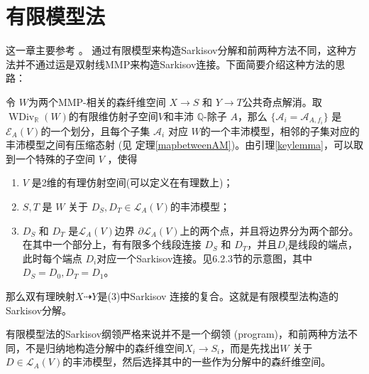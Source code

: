 \chapter{有限模型法}\label{thirdmethod}
这一章主要参考 \cite{haconSarkisovProgram2012}。 通过有限模型来构造Sarkisov分解和前两种方法不同，这种方法并不通过运是双射线MMP来构造Sarkisov连接。下面简要介绍这种方法的思路：

令 $W$为两个MMP-相关的森纤维空间 $X\to S$ 和 $Y\to T$公共奇点解消。取 $\operatorname{WDiv}_{\mathbb{R}}(W)$的有限维仿射子空间$V$和丰沛 $\mathbb{Q}$-除子 $A$，那么 $\{\mathcal{A}_{i} =\mathcal{A}_{A,f_{i}}\} $ 是 $\mathcal{E}_{A}(V)$的一个划分，且每个子集 $\mathcal{A}_{i}$ 对应 $W$的一个丰沛模型，相邻的子集对应的丰沛模型之间有压缩态射 (见 定理\ref{mapbetweenAM})。由引理\ref{keylemma}，可以取到一个特殊的子空间 $V$ ，使得 
\begin{enumerate}
  \item $V$ 是2维的有理仿射空间(可以定义在有理数上)； 
  \item $S,T$ 是 $W$ 关于 $D_{S},D_{T} \in \mathcal{L}_{A}(V) $的丰沛模型；
  \item $D_{S}$ 和 $D_{T}$ 是$\mathcal{L}_{A}(V)$边界 $\partial \mathcal{L}_{A}(V)$上的两个点，并且将边界分为两个部分。在其中一个部分上，有有限多个线段连接 $D_{S}$ 和 $D_{T}$，并且$D_{i}$是线段的端点，此时每个端点 $ D_{i}$对应一个Sarkisov连接。见6.2.3节的示意图，其中$D_S=D_0,D_T=D_1$。
\end{enumerate}
  那么双有理映射$X\dashrightarrow Y$是(3)中Sarkisov 连接的复合。这就是有限模型法构造的Sarkisov分解。
\begin{remark}
  有限模型法的Sarkisov纲领严格来说并不是一个纲领 (program)，和前两种方法不同，不是归纳地构造分解中的森纤维空间$X_{i}\to S_{i}$，而是先找出$W$ 关于$D \in \mathcal{L}_{A}(V)$的丰沛模型，然后选择其中的一些作为分解中的森纤维空间。
\end{remark}


